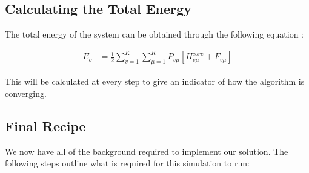 \documentclass[10pt, oneside, letterpaper]{article}
\begin{document}
\subsection{Calculating the Total Energy}

The total energy of the system can be obtained through the following equation \cite[p.~150]{szabo-quantum-chem}:

\begin{align*}
  E_o &= \frac{1}{2} \sum_{v = 1}^K\sum_{\mu = 1}^K P_{v \mu} \left[H_{v\mu}^{core} + F_{v\mu}\right] 
\end{align*}

This will be calculated at every step to give an indicator of how the algorithm is converging.

\subsection{Final Recipe}

We now have all of the background required to implement our solution. The following steps outline what is required for this simulation to run:
\end{document}
